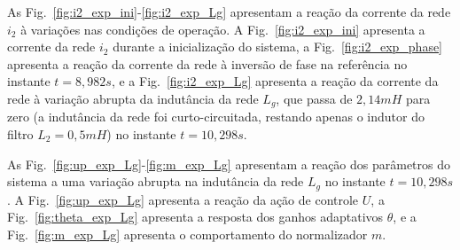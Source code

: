  As Fig.~\ref{fig:i2_exp_ini}-\ref{fig:i2_exp_Lg} apresentam a reação da corrente da rede $i_2$ à variações nas condições de operação. A Fig.~\ref{fig:i2_exp_ini} apresenta a corrente da rede $i_2$ durante a inicialização do sistema, a Fig.~\ref{fig:i2_exp_phase} apresenta a reação da corrente da rede à inversão de fase na referência no instante $t=8,982 s$, e a Fig.~\ref{fig:i2_exp_Lg} apresenta a reação da corrente da rede à variação abrupta da indutância da rede $L_g$, que passa de $2,14mH$ para zero (a indutância da rede foi curto-circuitada, restando apenas o indutor do filtro $L_2 = 0,5mH$) no instante $t=10,298 s$.

  \vfill
  \noindent
  \begin{minipage}{\textwidth}
    \makebox[\textwidth]{
      \centering
      \def\svgwidth{\textwidth}
      }
    \label{fig:i2_exp_ini}
  \end{minipage}
  \vfill

  \newpage

  \vspace*{\fill}

  \noindent
  \begin{minipage}{\textwidth}
    \makebox[\textwidth]{
      \centering
      \def\svgwidth{\textwidth}
      }
    \label{fig:i2_exp_phase}
  \end{minipage}

  \vspace*{\fill}
  \noindent
  \begin{minipage}{\textwidth}
    \makebox[\textwidth]{
      \centering
      \def\svgwidth{\textwidth}
      }
    \label{fig:i2_exp_Lg}
  \end{minipage}
  \vspace*{\fill}

  \newpage

  As Fig.~\ref{fig:up_exp_Lg}-\ref{fig:m_exp_Lg} apresentam a reação dos parâmetros do sistema a uma variação abrupta na indutância da rede $L_g$ no instante $t=10,298 s$. A Fig.~\ref{fig:up_exp_Lg} apresenta a reação da ação de controle $U$, a Fig.~\ref{fig:theta_exp_Lg} apresenta a resposta dos ganhos adaptativos $\theta$, e a Fig.~\ref{fig:m_exp_Lg} apresenta o comportamento do normalizador $m$.

